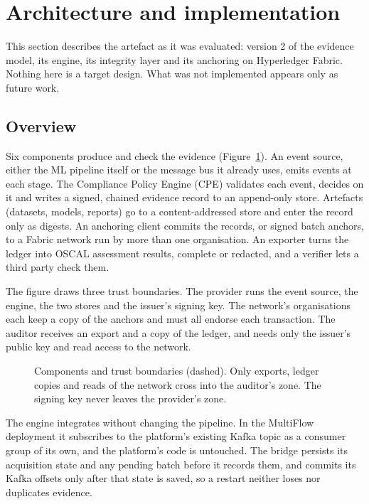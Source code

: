\section{Architecture and implementation}
\label{sec:architecture}

This section describes the artefact as it was evaluated: version 2 of the evidence model, its engine, its integrity layer and its anchoring on Hyperledger Fabric. Nothing here is a target design. What was not implemented appears only as future work.

\subsection{Overview}

Six components produce and check the evidence (Figure~\ref{fig:architecture}). An event source, either the ML pipeline itself or the message bus it already uses, emits events at each stage. The Compliance Policy Engine (CPE) validates each event, decides on it and writes a signed, chained evidence record to an append-only store. Artefacts (datasets, models, reports) go to a content-addressed store and enter the record only as digests. An anchoring client commits the records, or signed batch anchors, to a Fabric network run by more than one organisation. An exporter turns the ledger into OSCAL assessment results, complete or redacted, and a verifier lets a third party check them.

The figure draws three trust boundaries. The provider runs the event source, the engine, the two stores and the issuer's signing key. The network's organisations each keep a copy of the anchors and must all endorse each transaction. The auditor receives an export and a copy of the ledger, and needs only the issuer's public key and read access to the network.

\begin{figure}[t]
\centering
\resizebox{\textwidth}{!}{}
\caption{Components and trust boundaries (dashed). Only exports, ledger copies and reads of the network cross into the auditor's zone. The signing key never leaves the provider's zone.}
\label{fig:architecture}
\end{figure}

The engine integrates without changing the pipeline. In the MultiFlow deployment it subscribes to the platform's existing Kafka topic as a consumer group of its own, and the platform's code is untouched. The bridge persists its acquisition state and any pending batch before it records them, and commits its Kafka offsets only after that state is saved, so a restart neither loses nor duplicates evidence.

